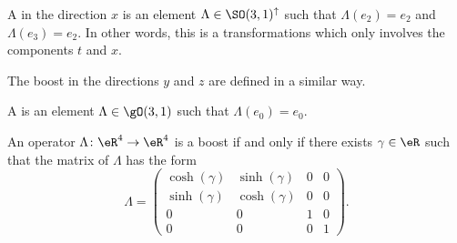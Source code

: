 \begin{definition}
    A  in the direction \( x\) is an element \( \Lambda\in \SO(3,1)^{\uparrow}\) such that \( \Lambda(e_2)=e_2\) and \( \Lambda(e_3)=e_2\). In other words, this is a transformations which only involves the components \( t\) and \( x\).

    The boost in the directions \( y\) and \( z\) are defined in a similar way.

    A  is an element \( \Lambda\in \gO(3,1)\) such that \( \Lambda(e_0)=e_0\).
\end{definition}

\begin{lemma}
    An operator \( \Lambda\colon \eR^4\to \eR^4\) is a boost if and only if there exists \( \gamma\in \eR\) such that the matrix of \( \Lambda\) has the form 
    \begin{equation}
        \Lambda=\begin{pmatrix}
             \cosh(\gamma)   &   \sinh(\gamma)    &   0    &   0    \\
             \sinh(\gamma)   &   \cosh(\gamma)    &   0    &   0    \\
             0   &   0    &   1    &   0    \\ 
             0   &   0    &   0    &   1     
         \end{pmatrix}.
    \end{equation}
\end{lemma}

